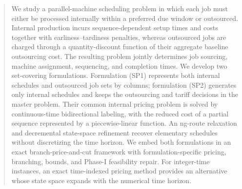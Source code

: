 \begin{abstract}
We study a parallel-machine scheduling problem in which each job must either be
processed internally within a preferred due window or outsourced. Internal
production incurs sequence-dependent setup times and costs together with
earliness--tardiness penalties, whereas outsourced jobs are charged through a
quantity-discount function of their aggregate baseline outsourcing cost. The
resulting problem jointly determines job sourcing, machine assignment, sequencing,
and completion times. We develop two set-covering formulations. Formulation
\textup{(SP1)} represents both internal schedules and outsourced job sets by
columns; formulation \textup{(SP2)} generates only internal schedules and keeps
the outsourcing and tariff decisions in the master problem. Their common internal
pricing problem is solved by continuous-time bidirectional labeling, with the
reduced cost of a partial sequence represented by a piecewise-linear function.
An ng-route relaxation and decremental state-space refinement recover elementary
schedules without discretizing the time horizon. We embed both formulations in an
exact branch-price-and-cut framework with formulation-specific pricing, branching,
bounds, and Phase-I feasibility repair. For integer-time instances, an exact
time-indexed pricing method provides an alternative whose state space expands with
the numerical time horizon.
\end{abstract}
